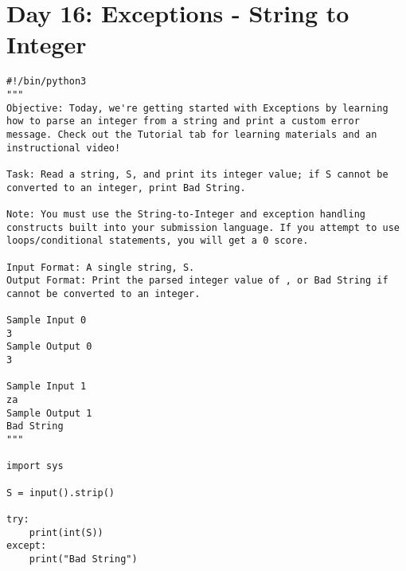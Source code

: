 \documentclass[11pt,a4paper]{article}
\begin{document}
\newpage
\section{Day 16: Exceptions - String to Integer}
\begin{lstlisting}
#!/bin/python3
"""
Objective: Today, we're getting started with Exceptions by learning how to parse an integer from a string and print a custom error message. Check out the Tutorial tab for learning materials and an instructional video!

Task: Read a string, S, and print its integer value; if S cannot be converted to an integer, print Bad String.

Note: You must use the String-to-Integer and exception handling constructs built into your submission language. If you attempt to use loops/conditional statements, you will get a 0 score.

Input Format: A single string, S.
Output Format: Print the parsed integer value of , or Bad String if  cannot be converted to an integer.

Sample Input 0
3
Sample Output 0
3

Sample Input 1
za
Sample Output 1
Bad String
"""

import sys

S = input().strip()

try:
    print(int(S))
except:
    print("Bad String")
\end{lstlisting}


\newpage
\end{document}
